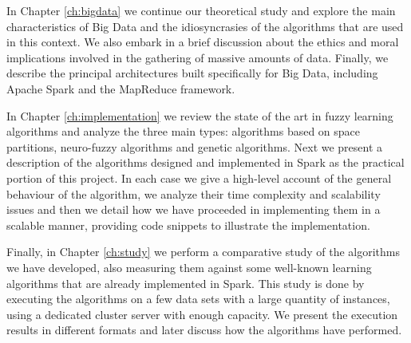 In Chapter \ref{ch:bigdata} we continue our theoretical study and explore the main characteristics of Big Data and the idiosyncrasies of the algorithms that are used in this context. We also embark in a brief discussion about the ethics and moral implications involved in the gathering of massive amounts of data. Finally, we describe the principal architectures built specifically for Big Data, including Apache Spark and the MapReduce framework.

In Chapter \ref{ch:implementation} we review the state of the art in fuzzy learning algorithms and analyze the three main types: algorithms based on space partitions, neuro-fuzzy algorithms and genetic algorithms. Next we present a description of the algorithms designed and implemented in Spark as the practical portion of this project. In each case we give a high-level account of the general behaviour of the algorithm, we analyze their time complexity and scalability issues and then we detail how we have proceeded in implementing them in a scalable manner, providing code snippets to illustrate the implementation.

Finally, in Chapter \ref{ch:study} we perform a comparative study of the algorithms we have developed, also measuring them against some well-known learning algorithms that are already implemented in Spark. This study is done by executing the algorithms on a few data sets with a large quantity of instances, using a dedicated cluster server with enough capacity. We present the execution results in different formats and later discuss how the algorithms have performed.
